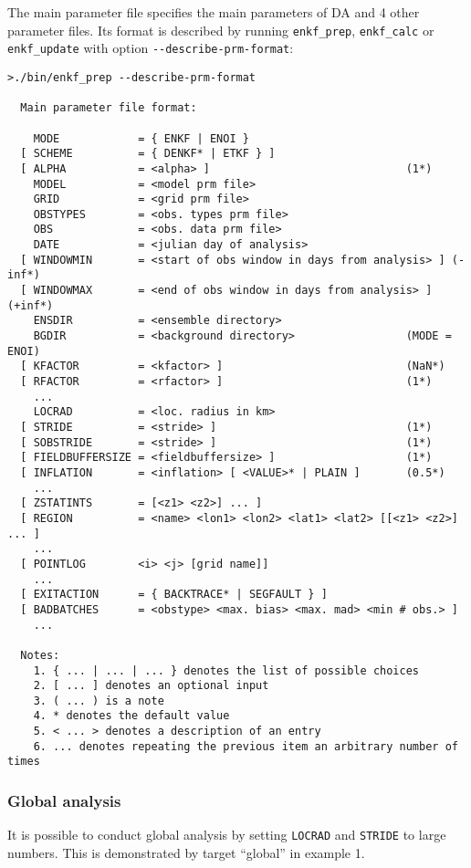 \documentclass[11pt]{report}
\begin{document}
The main parameter file specifies the main parameters of DA and 4 other parameter files.
Its format is described by running \verb|enkf_prep|, \verb|enkf_calc| or \verb|enkf_update| with option \verb|--describe-prm-format|:
\begin{Verbatim}[frame=single,fontsize=\footnotesize]
>./bin/enkf_prep --describe-prm-format

  Main parameter file format:

    MODE            = { ENKF | ENOI }
  [ SCHEME          = { DENKF* | ETKF } ]
  [ ALPHA           = <alpha> ]                              (1*)
    MODEL           = <model prm file>
    GRID            = <grid prm file>
    OBSTYPES        = <obs. types prm file>
    OBS             = <obs. data prm file>
    DATE            = <julian day of analysis>
  [ WINDOWMIN       = <start of obs window in days from analysis> ] (-inf*)
  [ WINDOWMAX       = <end of obs window in days from analysis> ]   (+inf*)
    ENSDIR          = <ensemble directory>
    BGDIR           = <background directory>                 (MODE = ENOI)
  [ KFACTOR         = <kfactor> ]                            (NaN*)
  [ RFACTOR         = <rfactor> ]                            (1*)
    ...
    LOCRAD          = <loc. radius in km>
  [ STRIDE          = <stride> ]                             (1*)
  [ SOBSTRIDE       = <stride> ]                             (1*)
  [ FIELDBUFFERSIZE = <fieldbuffersize> ]                    (1*)
  [ INFLATION       = <inflation> [ <VALUE>* | PLAIN ]       (0.5*)
    ...
  [ ZSTATINTS       = [<z1> <z2>] ... ]
  [ REGION          = <name> <lon1> <lon2> <lat1> <lat2> [[<z1> <z2>] ... ]
    ...
  [ POINTLOG        <i> <j> [grid name]]
    ...
  [ EXITACTION      = { BACKTRACE* | SEGFAULT } ]
  [ BADBATCHES      = <obstype> <max. bias> <max. mad> <min # obs.> ]
    ...

  Notes:
    1. { ... | ... | ... } denotes the list of possible choices
    2. [ ... ] denotes an optional input
    3. ( ... ) is a note
    4. * denotes the default value
    5. < ... > denotes a description of an entry
    6. ... denotes repeating the previous item an arbitrary number of times
\end{Verbatim}

\subsubsection{Global analysis}

It is possible to conduct global analysis by setting \verb|LOCRAD| and \verb|STRIDE| to large numbers.
This is demonstrated by target ``global'' in example 1.
\end{document}
